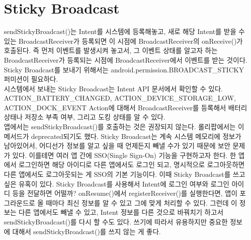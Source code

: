 \section{Sticky Broadcast}
sendStickyBroadcast()는 Intent를 시스템에 등록해놓고, 새로 해당 Intent를 받을 수 있는 BroadcastReceiver가 등록되면 이 시점에 BroadcastReceiver의 onReceive()가 호출된다. 즉 먼저 이벤트를 발생시켜 놓고서, 그 이벤트 상태를 알고자 하는 BroadcastReceiver가 등록되는 시점에 BroadcastReceiver에서 이벤트를 받는 것이다.
Sticky Broadcast를 보내기 위해서는 android.permission.BROADCAST\_STICKY 퍼미션이 필요하다.\\

시스템에서 보내는 Sticky Broadcast는 Intent API 문서에서 확인할 수 있다. ACTION\_BATTERY\_CHANGED, ACTION\_DEVICE\_STORAGE\_LOW, ACTION\_DOCK\_EVENT Action에 대해서 BroadcastReceiver를 등록해서 배터리 상태나 저장소 부족 여부, 그리고 도킹 상태를 알 수 있다.\\

앱에서는 sendStickyBroadcast()를 호출하는 것은 권장되지 않는다. 롤리팝에서는 이 메서드가 deprecated되기도 했다.
Sticky Broadcast는 계속 시스템 메모리에 정보가 남아있어서, 어디선가 정보를 알고 싶을 때 언제든지 빼낼 수가 있기 때문에 보안 문제가 있다.
이를테면 여러 앱 간에 SSO(Single Sign-On) 기능을 구현하고자 한다. 
한 앱에서 로그인하면 해당 아이디로 다른 앱에서도 로그인 되고, 명시적으로 로그아웃하면 다른 앱에서도 로그아웃되는 게 SSO의 기본 기능이다. 이때 Sticky Broadcast를 쓰고 싶은 유혹이 있다. 
Sticky Broadcast를 사용해서 Intent에 로그인 여부와 로그인 아이디 등을 전달하면 어떨까? 
onResume()에서 registerReceiver()를 실행한다면, 앱이 포그라운드로 올 때마다 최신 정보를 알 수 있고 그에 맞게 처리할 수 있다. 그런데 이 정보는 다른 앱에서도 빼낼 수 있고, Intent 정보를 다른 것으로 바꿔치기 하고서 sendStickyBroadcast()를 다시 할 수도 있다.
쓰기에 따라서 유용하지만 중요한 정보에 대해서 sendStickyBroadcast()를 쓰지 않는 게 좋다. 

\begin{comment}
onReceive 메서드가 끝나면, BroadcastReceiver가 끝나서, 스레드로 작업 할 수는 없으므로, 
일반적으로 시간이 오래 걸리는 작업이 있다면, BroadcastReceiver에서 Service를 실행시킨다.

내부적으로 unregister를 하고 있다.
LoadedApk?
07-01 10:28:19.472: E/ActivityThread(4568): Activity com.suribada.misc.BroadcastRecieverActivity has leaked IntentReceiver \verb|com.suribada.misc.BroadcastRecieverActivity$1@b5a4f558 that was originally registered here. Are you missing a call to unregisterReceiver()?|
\end{comment}

